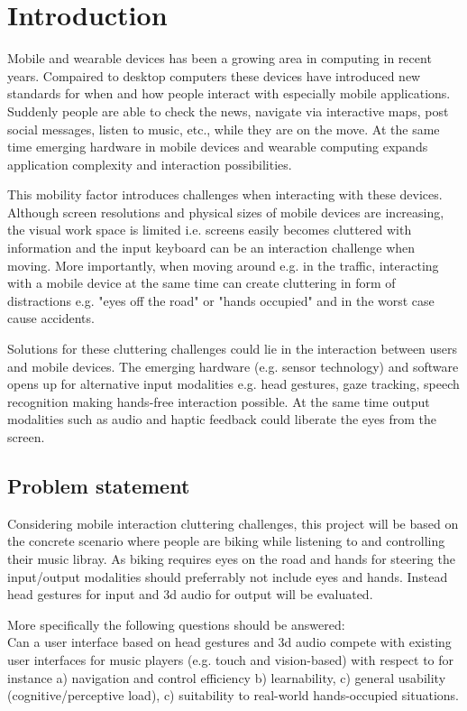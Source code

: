 \chapter{Introduction}
Mobile and wearable devices has been a growing area in computing in recent years. Compaired to desktop computers these devices have introduced new standards for when and how people interact with especially mobile applications. Suddenly people are able to check the news, navigate via interactive maps, post social messages, listen to music, etc., while they are on the move. At the same time emerging hardware in mobile devices and wearable computing expands application complexity and interaction possibilities.

This mobility factor introduces challenges when interacting with these devices. Although screen resolutions and physical sizes of mobile devices are increasing, the visual work space is limited i.e. screens easily becomes cluttered with information and the input keyboard can be an interaction challenge when moving. More importantly, when moving around e.g. in the traffic, interacting with a mobile device at the same time can create cluttering in form of distractions e.g. "eyes off the road" or "hands occupied" and in the worst case cause accidents.

Solutions for these cluttering challenges could lie in the interaction between users and mobile devices. The emerging hardware (e.g. sensor technology) and software opens up for alternative input modalities e.g. head gestures, gaze tracking, speech recognition making hands-free interaction possible. At the same time output modalities such as audio and haptic feedback could liberate the eyes from the screen.

\section{Problem statement}
Considering mobile interaction cluttering challenges, this project will be based on the concrete scenario where people are biking while listening to and controlling their music libray. As biking requires eyes on the road and hands for steering the input/output modalities should preferrably not include eyes and hands. Instead head gestures for input and 3d audio for output will be evaluated.

More specifically the following questions should be answered:\\
Can a user interface based on head gestures and 3d audio compete with existing user interfaces for music players (e.g. touch and vision-based) with respect to for instance a) navigation and control efficiency b) learnability, c) general usability (cognitive/perceptive load), c) suitability to real-world hands-occupied situations. 

